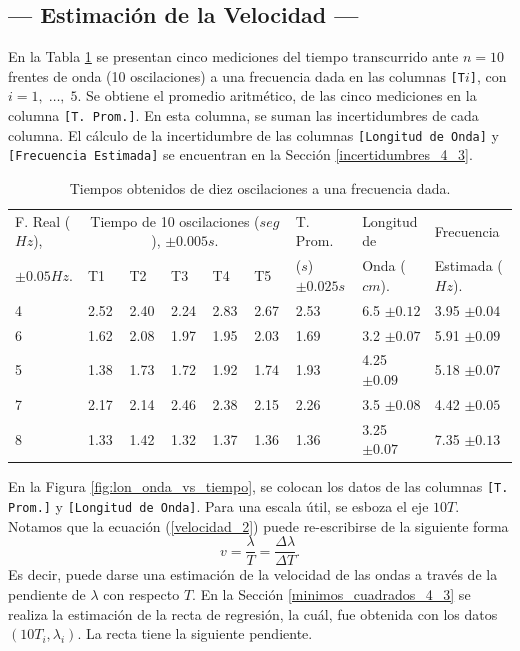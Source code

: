 \documentclass[12pt,a4paper]{article}
\begin{document}
\subsection{--- Estimación de la Velocidad ---} %
\label{sub:calculo_velocidad}
En la Tabla \ref{segunda_tabla} se presentan cinco mediciones del tiempo transcurrido ante \(n=10\) frentes de onda (10 oscilaciones) a una frecuencia dada en las columnas \texttt{[T\(i\)]}, con \(i=1, \;\ldots,\; 5\). Se obtiene el promedio aritmético, de las cinco mediciones en la columna \texttt{[T. Prom.]}. En esta columna, se suman las incertidumbres de cada columna. El cálculo de la incertidumbre de las columnas \texttt{[Longitud de Onda]} y \texttt{[Frecuencia Estimada]} se encuentran en la Sección \ref{incertidumbres_4_3}. 
\begin{table}[ht]
	\footnotesize 
	\centering
	\caption{Tiempos obtenidos de diez oscilaciones a una frecuencia dada.}
	\begin{tabular}{|p{2cm}|*{5}{p{9mm}|}p{1.4cm}|p{2cm}|p{2.4cm}|}
		\hline 
		F. Real (\(Hz\)), & \multicolumn{5}{|c|}{Tiempo de 10 oscilaciones (\(seg\)), \(\pm 0.005s\).} & T. Prom.  & Longitud de & Frecuencia  \\ \cline{2-6}
		\(\pm 0.05Hz\). & T1 & T2 & T3 & T4 & T5 & (\(s\))\(\pm 0.025s\)&  Onda (\(cm\)).& Estimada (\(Hz\)).\\ \hline
		4 &2.52 &2.40 &2.24 &2.83 &2.67    &2.53    &6.5  \(\pm 0.12\) &3.95 \(\pm 0.04\) \\ \hline
		6 &1.62 &2.08 &1.97 &1.95 &2.03    &1.69    &3.2  \(\pm 0.07\) &5.91 \(\pm 0.09\) \\ \hline
		5 &1.38 &1.73 &1.72 &1.92 &1.74    &1.93    &4.25 \(\pm 0.09\) &5.18 \(\pm 0.07\) \\ \hline
		7 &		2.17 &2.14 &2.46 &2.38 &2.15 &2.26 &3.5  \(\pm 0.08\) &4.42 \(\pm 0.05\) \\ \hline
		8 &1.33 &1.42 &1.32 &1.37 &1.36    &1.36    &3.25 \(\pm 0.07\) &7.35 \(\pm 0.13\) \\ \hline
	\end{tabular}
	\label{segunda_tabla}
\end{table}
\newpage
En la Figura \ref{fig:lon_onda_vs_tiempo}, se colocan los datos de las columnas \texttt{[T. Prom.]} y \texttt{[Longitud de Onda]}. Para una escala útil, se esboza el eje \(10T\). Notamos que la ecuación (\ref{velocidad_2}) puede re-escribirse de la siguiente forma \vspace{-3mm}
\[
	v = \dfrac{\lambda}{T} = \dfrac{\Delta \lambda}{\Delta T}.
\]
Es decir, puede darse una estimación de la velocidad de las ondas a través de la pendiente de \(\lambda\) con respecto \(T\). En la Sección \ref{minimos_cuadrados_4_3} se realiza la estimación de la recta de regresión, la cuál, fue obtenida con los datos \((10T_i, \lambda _i)\). La recta tiene la siguiente pendiente.\vspace{-3mm}
\end{document}
